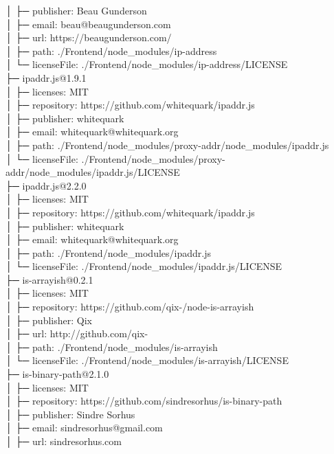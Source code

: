 │  ├─ publisher: Beau Gunderson\\
│  ├─ email: beau@beaugunderson.com\\
│  ├─ url: https://beaugunderson.com/\\
│  ├─ path: ./Frontend/node\_modules/ip-address\\
│  └─ licenseFile: ./Frontend/node\_modules/ip-address/LICENSE\\
├─ ipaddr.js@1.9.1\\
│  ├─ licenses: MIT\\
│  ├─ repository: https://github.com/whitequark/ipaddr.js\\
│  ├─ publisher: whitequark\\
│  ├─ email: whitequark@whitequark.org\\
│  ├─ path: ./Frontend/node\_modules/proxy-addr/node\_modules/ipaddr.js\\
│  └─ licenseFile: ./Frontend/node\_modules/proxy-addr/node\_modules/ipaddr.js/LICENSE\\
├─ ipaddr.js@2.2.0\\
│  ├─ licenses: MIT\\
│  ├─ repository: https://github.com/whitequark/ipaddr.js\\
│  ├─ publisher: whitequark\\
│  ├─ email: whitequark@whitequark.org\\
│  ├─ path: ./Frontend/node\_modules/ipaddr.js\\
│  └─ licenseFile: ./Frontend/node\_modules/ipaddr.js/LICENSE\\
├─ is-arrayish@0.2.1\\
│  ├─ licenses: MIT\\
│  ├─ repository: https://github.com/qix-/node-is-arrayish\\
│  ├─ publisher: Qix\\
│  ├─ url: http://github.com/qix-\\
│  ├─ path: ./Frontend/node\_modules/is-arrayish\\
│  └─ licenseFile: ./Frontend/node\_modules/is-arrayish/LICENSE\\
├─ is-binary-path@2.1.0\\
│  ├─ licenses: MIT\\
│  ├─ repository: https://github.com/sindresorhus/is-binary-path\\
│  ├─ publisher: Sindre Sorhus\\
│  ├─ email: sindresorhus@gmail.com\\
│  ├─ url: sindresorhus.com\\
